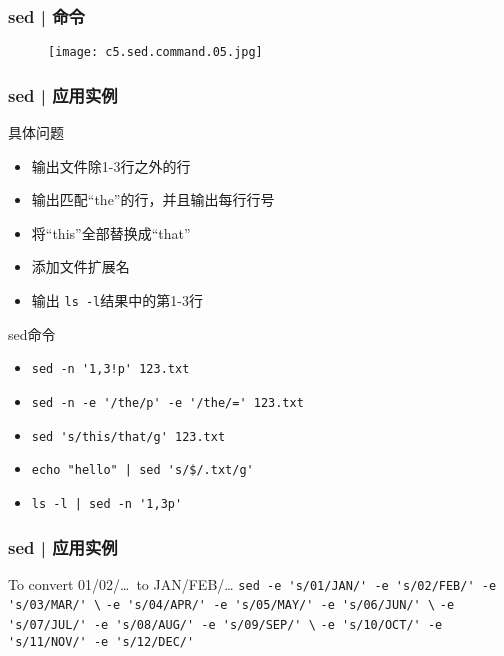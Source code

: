 \begin{frame}
  \frametitle{sed | 命令}
  \begin{figure}
    \centering
    \texttt{[image: c5.sed.command.05.jpg]}
  \end{figure}
\end{frame}

\begin{frame}[fragile]
  \frametitle{sed | \alert{应用实例}}
  \begin{block}{具体问题}
    \begin{itemize}
      \item<2-> 输出文件除1-3行之外的行 
      \item<4-> 输出匹配“the”的行，并且输出每行行号
      \item<6-> 将“this”全部替换成“that”
      \item<8-> 添加文件扩展名
      \item<10-> 输出 \verb|ls -l|结果中的第1-3行
    \end{itemize}
  \end{block}
  \begin{block}{sed命令}
    \begin{itemize}
      \item<3-> \verb|sed -n '1,3!p' 123.txt|
      \item<5-> \verb|sed -n -e '/the/p' -e '/the/=' 123.txt|
      \item<7-> \verb|sed 's/this/that/g' 123.txt|
      \item<9-> \verb=echo "hello" | sed 's/$/.txt/g'=
      \item<11-> \verb=ls -l | sed -n '1,3p'=
    \end{itemize}
  \end{block}
\end{frame}

\begin{frame}[fragile]
  \frametitle{sed | 应用实例}
  \begin{block}{To convert 01/02/\ldots \ to JAN/FEB/\ldots}
    \verb|sed -e 's/01/JAN/' -e 's/02/FEB/' -e 's/03/MAR/' \|
    \verb|-e 's/04/APR/' -e 's/05/MAY/' -e 's/06/JUN/' \|
    \verb|-e 's/07/JUL/' -e 's/08/AUG/' -e 's/09/SEP/' \|
    \verb|-e 's/10/OCT/' -e 's/11/NOV/' -e 's/12/DEC/'|
  \end{block}
\end{frame}

